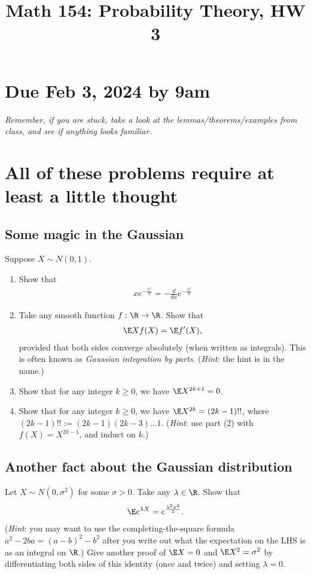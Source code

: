 \documentclass[12pt,reqno]{amsart}
\title{\Large Math 154: Probability Theory, HW 3\vspace{-0.1cm}}
\theoremstyle{definition}
\theoremstyle{remark}
\numberwithin{equation}{section}
\newenvironment{nouppercase}{%
  \let\uppercase\relax%
  \renewcommand{\uppercasenonmath}[1]{}}{}
\begin{document}
\begin{nouppercase}
\maketitle
\end{nouppercase}
\section*{Due Feb 3, 2024 by 9am}
\emph{Remember, if you are stuck, take a look at the lemmas/theorems/examples from class, and see if anything looks familiar.}
\section{All of these problems require at least a little thought}
\subsection{Some magic in the Gaussian}
Suppose $X\sim N(0,1)$. 
\begin{enumerate}
\item Show that 
%
\begin{align*}
xe^{-\frac{x^{2}}{2}}=-\frac{d}{dx}e^{-\frac{x^{2}}{2}}
\end{align*}
%
\item Take any smooth function $f:\R\to\R$. Show that 
%
\begin{align*}
\E Xf(X)=\E f'(X),
\end{align*}
%
provided that both sides converge absolutely (when written as integrals). This is often known as \emph{Gaussian integration by parts}. (\emph{Hint}: the hint is in the name.)
\item Show that for any integer $k\geq0$, we have $\E X^{2k+1}=0$. 
\item Show that for any integer $k\geq0$, we have $\E X^{2k}=(2k-1)!!$, where $(2k-1)!!:=(2k-1)(2k-3)\ldots1$. (\emph{Hint}: use part (2) with $f(X)=X^{2k-1}$, and induct on $k$.)
\end{enumerate}
\subsection{Another fact about the Gaussian distribution}
Let $X\sim N(0,\sigma^{2})$ for some $\sigma>0$. Take any $\lambda\in\R$. Show that 
%
\begin{align}
\E e^{\lambda X}=e^{\frac{\lambda^{2}\sigma^{2}}{2}}.\nonumber
\end{align}
%
(\emph{Hint}: you may want to use the completing-the-square formula $a^{2}-2ba=(a-b)^{2}-b^{2}$ after you write out what the expectation on the LHS is as an integral on $\R$.) Give another proof of $\E X=0$ and $\E X^{2}=\sigma^{2}$ by differentiating both sides of this identity (once and twice) and setting $\lambda=0$.
\end{document}
